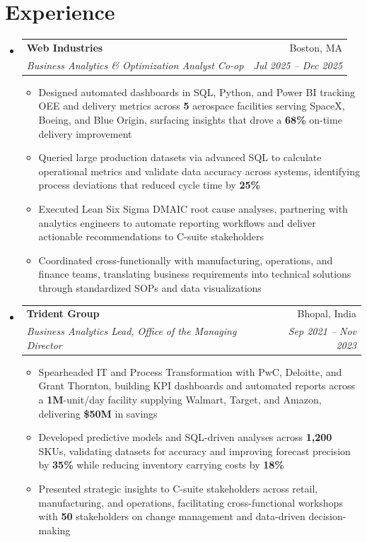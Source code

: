 \documentclass[letterpaper,10pt]{article}
\makeatletter
\newcommand{\resumeSubheading}[4]{
  \vspace{1pt}\item
    \begin{tabular*}{0.97\textwidth}[t]{l@{\extracolsep{\fill}}r}
      \textbf{#1} & #2 \\
      \textit{\small#3} & \textit{\small #4} \\
    \end{tabular*}\vspace{-4pt}
}
\newcommand{\resumeItem}[1]{\item\small{{#1 \vspace{-1pt}}}}
\newcommand{\resumeItemListStart}{\begin{itemize}[leftmargin=0.15in, label=$\bullet$]}
\newcommand{\resumeItemListEnd}{\end{itemize}\vspace{-2pt}}
\newcommand{\resumeSubHeadingListStart}{\begin{itemize}[leftmargin=0.15in, label={}]}
\newcommand{\resumeSubHeadingListEnd}{\end{itemize}}
\makeatother
\begin{document}
\section{Experience}
\resumeSubHeadingListStart
\resumeSubheading
{Web Industries}{Boston, MA}
{Business Analytics \& Optimization Analyst Co-op}{Jul 2025 -- Dec 2025}
\resumeItemListStart
\resumeItem{Designed automated dashboards in SQL, Python, and Power BI tracking OEE and delivery metrics across \textbf{5} aerospace facilities serving SpaceX, Boeing, and Blue Origin, surfacing insights that drove a \textbf{68\%} on-time delivery improvement}
\resumeItem{Queried large production datasets via advanced SQL to calculate operational metrics and validate data accuracy across systems, identifying process deviations that reduced cycle time by \textbf{25\%}}
\resumeItem{Executed Lean Six Sigma DMAIC root cause analyses, partnering with analytics engineers to automate reporting workflows and deliver actionable recommendations to C-suite stakeholders}
\resumeItem{Coordinated cross-functionally with manufacturing, operations, and finance teams, translating business requirements into technical solutions through standardized SOPs and data visualizations}
\resumeItemListEnd
\resumeSubheading
{Trident Group}{Bhopal, India}
{Business Analytics Lead, Office of the Managing Director}{Sep 2021 -- Nov 2023}
\resumeItemListStart
\resumeItem{Spearheaded IT and Process Transformation with PwC, Deloitte, and Grant Thornton, building KPI dashboards and automated reports across a \textbf{1M}-unit/day facility supplying Walmart, Target, and Amazon, delivering \textbf{\$50M} in savings}
\resumeItem{Developed predictive models and SQL-driven analyses across \textbf{1,200} SKUs, validating datasets for accuracy and improving forecast precision by \textbf{35\%} while reducing inventory carrying costs by \textbf{18\%}}
\resumeItem{Presented strategic insights to C-suite stakeholders across retail, manufacturing, and operations, facilitating cross-functional workshops with \textbf{50} stakeholders on change management and data-driven decision-making}
\resumeItemListEnd
\resumeSubHeadingListEnd
\end{document}
